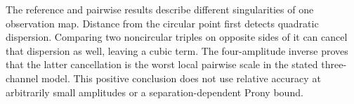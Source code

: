 The reference and pairwise results describe different singularities of
one observation map. Distance from the circular point first detects
quadratic dispersion. Comparing two noncircular triples on opposite
sides of it can cancel that dispersion as well, leaving a cubic term.
The four-amplitude inverse proves that the latter cancellation is the
worst local pairwise scale in the stated three-channel model. This
positive conclusion does not use relative accuracy at arbitrarily small
amplitudes or a separation-dependent Prony bound.
